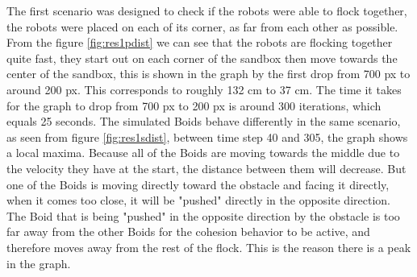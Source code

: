The first scenario was designed to check if the robots were able to flock together, the robots were placed on each of its corner, as far from each other as possible.
From the figure \ref{fig:res1pdist} we can see that the robots are flocking together quite fast, they start out on each corner of the sandbox then move towards the center of the sandbox, this is shown in the graph by the first drop from 700 px to around 200 px. This corresponds to roughly 132 cm to 37 cm. The time it takes for the graph to drop from 700 px to 200 px is around 300 iterations, which equals 25 seconds.
The simulated Boids behave differently in the same scenario, as seen from figure \ref{fig:res1sdist}, between time step 40 and 305, the graph shows a local maxima. Because all of the Boids are moving towards the middle due to the velocity they have at the start, the distance between them will decrease. But one of the Boids is moving directly toward the obstacle and facing it directly, when it comes too close, it will be "pushed" directly in the opposite direction. The Boid that is being "pushed" in the opposite direction by the obstacle is too far away from the other Boids for the cohesion behavior to be active, and therefore moves away from the rest of the flock. This is the reason there is a peak in the graph.

